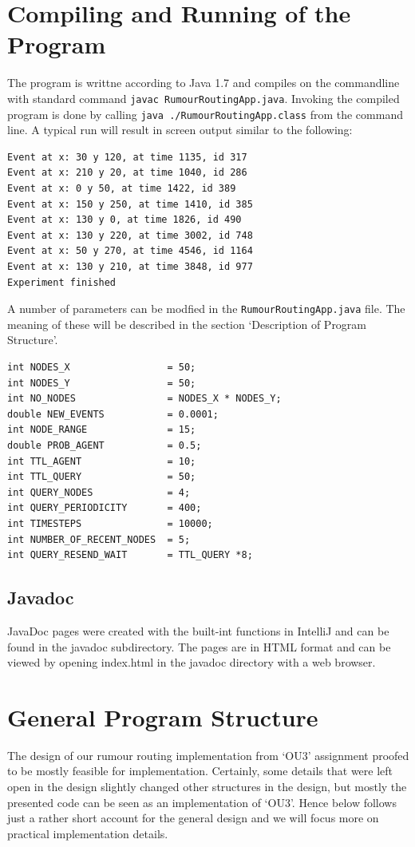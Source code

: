 \documentclass[a4paper,11pt,twoside]{article}
\begin{document}
\section{Compiling and Running of the Program}

The program is writtne according to Java 1.7 and compiles on the
commandline with standard command \texttt{javac RumourRoutingApp.java}.
Invoking the compiled program is done by calling \texttt{java
  ./RumourRoutingApp.class} from the command line.
A typical run will result in screen output similar to the following:
\begin{verbatim}
Event at x: 30 y 120, at time 1135, id 317 
Event at x: 210 y 20, at time 1040, id 286 
Event at x: 0 y 50, at time 1422, id 389 
Event at x: 150 y 250, at time 1410, id 385 
Event at x: 130 y 0, at time 1826, id 490 
Event at x: 130 y 220, at time 3002, id 748 
Event at x: 50 y 270, at time 4546, id 1164 
Event at x: 130 y 210, at time 3848, id 977 
Experiment finished
\end{verbatim}

A number of parameters can be modfied in the
\texttt{RumourRoutingApp.java} file. The meaning of these will be
described in the section `Description of Program Structure'.  
\begin{verbatim}
int NODES_X                 = 50;
int NODES_Y                 = 50;
int NO_NODES                = NODES_X * NODES_Y;
double NEW_EVENTS           = 0.0001;
int NODE_RANGE              = 15;
double PROB_AGENT           = 0.5;
int TTL_AGENT               = 10;
int TTL_QUERY               = 50;
int QUERY_NODES             = 4;
int QUERY_PERIODICITY       = 400;
int TIMESTEPS               = 10000;
int NUMBER_OF_RECENT_NODES  = 5;
int QUERY_RESEND_WAIT       = TTL_QUERY *8;
\end{verbatim}



\subsection{Javadoc}
JavaDoc pages were created with the built-int functions in IntelliJ
and can be found in the javadoc subdirectory. The pages are in HTML
format and can be viewed by opening index.html in the javadoc
directory with a web browser. 



\section{General Program Structure}
The design of our rumour routing implementation from `OU3' assignment
proofed to be mostly feasible for implementation. Certainly, some
details that were left open in the design slightly changed other
structures in the design, but mostly the presented code can be seen as
an implementation of `OU3'. Hence below follows just a rather short
account for the general design and we will focus more on practical
implementation details. 
\end{document}
